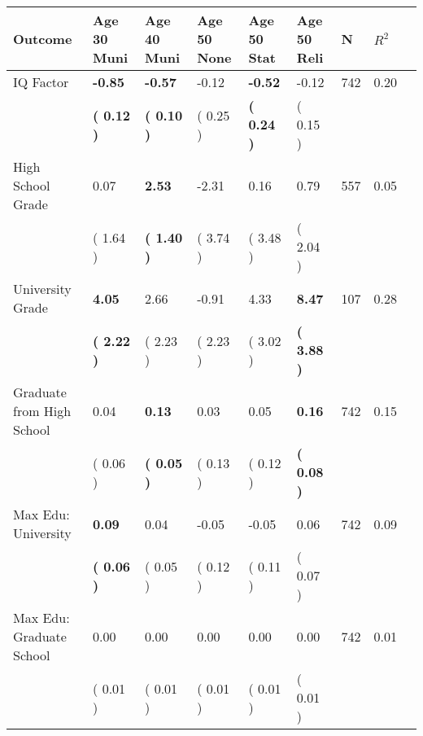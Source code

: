 \begin{tabular}{L{6.2cm} C{1.8cm} C{1.8cm} C{1.8cm} C{1.8cm} C{1.8cm} C{1.8cm} C{0.3cm} C{0.3cm}}
\toprule
 \textbf{Outcome} & \textbf{Age 30 Muni} & \textbf{Age 40 Muni} & \textbf{Age 50 None} & \textbf{Age 50 Stat} & \textbf{Age 50 Reli} & \textbf{N} & \textbf{$ R^2$} \\
\midrule
IQ Factor & \textbf{    -0.85} & \textbf{    -0.57} &     -0.12 & \textbf{    -0.52} &     -0.12  & 742 &       0.20 \\ 
 & \textbf{(     0.12 )} & \textbf{(     0.10 )} & (     0.25 ) & \textbf{(     0.24 )} & (     0.15 )  & \\
High School Grade &      0.07 & \textbf{     2.53} &     -2.31 &      0.16 &      0.79  & 557 &       0.05 \\ 
 & (     1.64 ) & \textbf{(     1.40 )} & (     3.74 ) & (     3.48 ) & (     2.04 )  & \\
University Grade & \textbf{     4.05} &      2.66 &     -0.91 &      4.33 & \textbf{     8.47}  & 107 &       0.28 \\ 
 & \textbf{(     2.22 )} & (     2.23 ) & (     2.23 ) & (     3.02 ) & \textbf{(     3.88 )}  & \\
Graduate from High School &      0.04 & \textbf{     0.13} &      0.03 &      0.05 & \textbf{     0.16}  & 742 &       0.15 \\ 
 & (     0.06 ) & \textbf{(     0.05 )} & (     0.13 ) & (     0.12 ) & \textbf{(     0.08 )}  & \\
Max Edu: University & \textbf{     0.09} &      0.04 &     -0.05 &     -0.05 &      0.06  & 742 &       0.09 \\ 
 & \textbf{(     0.06 )} & (     0.05 ) & (     0.12 ) & (     0.11 ) & (     0.07 )  & \\
Max Edu: Graduate School &      0.00 &      0.00 &      0.00 &      0.00 &      0.00  & 742 &       0.01 \\ 
 & (     0.01 ) & (     0.01 ) & (     0.01 ) & (     0.01 ) & (     0.01 )  & \\
\bottomrule
\end{tabular}
